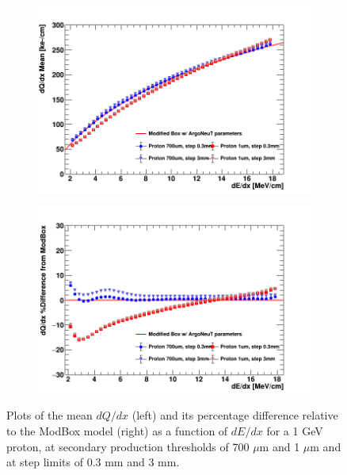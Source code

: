 \begin{figure}[bp!]
        \begin{subfigure}[b]{0.495\textwidth}   
            \centering 
            \includegraphics[width=\textwidth]{proton_profile_steplim}
            \caption{}%
            \label{fig:proton_steplim_magnitude}
        \end{subfigure}
        \hfill
        \begin{subfigure}[b]{0.495\textwidth}   
            \centering 
            \includegraphics[width=\textwidth]{proton_profile_diff_steplim}
            \caption{}%
            \label{fig:proton_steplim_diff}
        \end{subfigure}
        \caption{Plots of the mean $dQ/dx$ (left) and its percentage difference relative to the ModBox model (right) as a function of $dE/dx$ for a 1 GeV proton, at secondary production thresholds of 700 $\mu$m and 1 $\mu$m and at step limits of 0.3 mm and 3 mm. }
        \label{fig:proton_steplim}
\end{figure}
